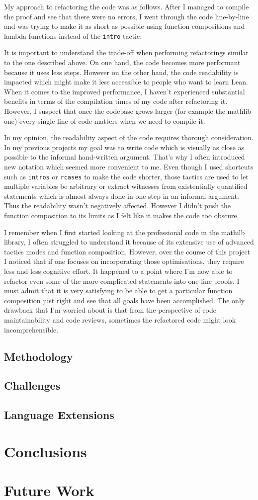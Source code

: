 \documentclass[11pt]{article}
\begin{document}
My approach to refactoring the code was as follows. After I managed to compile the proof
and see that there were no errors, I went through the code line-by-line and was
trying to make it as short as possible using function compositions and lambda
functions instead of the \texttt{intro} tactic.

It is important to understand the trade-off when performing refactorings similar to
the one described above. On one hand, the code becomes more performant because it
uses less steps. However on the other hand, the code readability is impacted which
might make it less accessible to people who want to learn Lean. When it comes to the
improved performance, I haven't experienced substantial benefits in terms of the
compilation times of my code after refactoring it. However, I suspect that once
the codebase grows larger (for example the mathlib one) every single line of
code matters when we need to compile it.

In my opinion, the readability aspect of the code requires thorough consideration.
In my previous projects my goal was to write code which is visually as close as possible
to the informal hand-written argument. That's why I often introduced new notation which
seemed more convenient to me. Even though I used shortcuts such as \texttt{intros} or \texttt{rcases} to make
the code shorter, those tactics are used to let multiple variables be arbitrary
or extract witnesses from existentially quantified statements which is almost always
done in one step in an informal argument. Thus the readability wasn't negatively affected.
However I didn't push the function composition to its limits as I felt like it
makes the code too obscure.

I remember when I first started looking at the professional code in the mathilb
library, I often struggled to understand it because of its extensive use of advanced
tactics modes and function composition. However, over the course of this project
I noticed that if one focuses on incorporating those optimisations, they require
less and less cognitive effort. It happened to a point where I'm now able to
refactor even some of the more complicated statements into one-line proofs.
I must admit that it is very satisfying to be able to get a particular function
composition just right and see that all goals have been accomplished. The only
drawback that I'm worried about is that from the perspective of code maintainability
and code reviews, sometimes the refactored code might look incomprehensible.




\subsection*{Methodology}
\subsection*{Challenges}
\subsection*{Language Extensions}
\section*{Conclusions}
\section*{Future Work}
\end{document}
